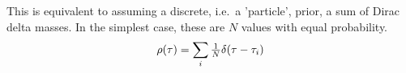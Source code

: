 \documentclass{article}
\begin{document}
This is equivalent to assuming a discrete, i.e.\ a 'particle', prior, a sum
of Dirac delta masses. In the simplest case, these are $N$ values with equal
probability.
\begin{equation}
\rho({ \tau }) = \sum_i  
	\tfrac 1N \delta({ \tau }- { \tau }_i) 
\label{eq:basic_prior_over_tau}
\end{equation} 


% 
% 
% 
% 
% 
%  
\end{document}
